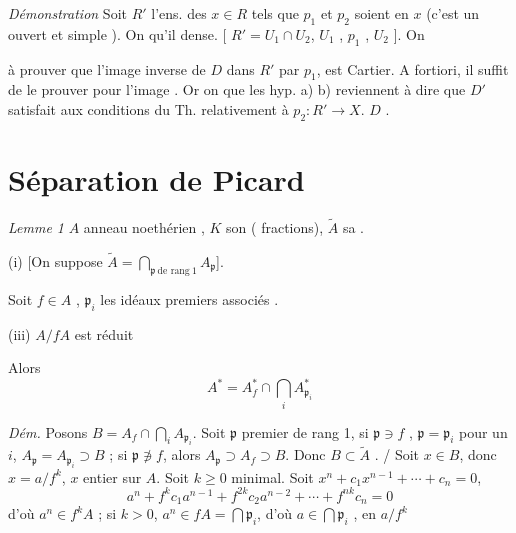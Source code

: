 \documentclass[11pt,a4paper]{article}
\begin{document}
\emph{Démonstration} Soit  $R'$ l'ens. des $x\in R$ tels que
$p_1$ et $p_2$ soient \ill{} en $x$ (c'est un ouvert \ill{} \ill{} et simple \ill{}). On
\ill{} qu'il  \ill{} \ill{} \ill{} \ill{} \ill{} dense.
[\ill{} $R'=U_1\cap U_2$, $U_1$ \ill{} \ill{} \ill{}, \ill{} \ill{} \ill{} $p_1$ \ill{}
\ill{} \ill{} \ill{}, \ill{} \ill{} \ill{} \ill{} $U_2$ \ill{}]. On \ill{} \ill{}
\marginal{\ill{}}

à prouver que l'image inverse  de $D$ dans $R'$ par
$p_1$, \struck{\ill{}} est Cartier. A fortiori, il suffit de le prouver pour l'image
\ill{} \ill{}.
Or \struck{\ill{}} on \ill{} que les hyp. a) b) \struck{\ill{}} reviennent à dire que $D'$
satisfait aux conditions du Th. relativement à $p_2\colon R'\to X$. \ill{} \ill{} $D$
\ill{} \ill{} \ill{} .

\section{Séparation de Picard}

\emph{Lemme 1} $A$ anneau noethérien  , $K$ son
  \ill{} (\ill{} fractions), $\tilde{A}$ sa \struck{\ill{}}
 \ill{}.

(i) [On suppose $\tilde{A}=\bigcap_{\mathfrak{p}\ \text{de rang}\ 1}A_{\mathfrak{p}}$].

Soit $f\in A$  , $\mathfrak{p}_i$ les idéaux
premiers associés \ill{}.

 

(iii) $A/fA$ est réduit

 Alors
\[
\boxed{A^*=A_f^*\cap\bigcap_i A^*_{\mathfrak{p}_i}}
\]

\emph{Dém.} Posons $B=A_f\cap\bigcap_i A_{\mathfrak{p}_i}$. Soit $\mathfrak{p}$ premier de
rang 1, si $\mathfrak{p}\ni f$ \ill{}, $\mathfrak{p}=\mathfrak{p}_i$ pour un $i$, \ill{}
$A_{\mathfrak{p}}=A_{\mathfrak{p}_i}\supset B$ ; si $\mathfrak{p}\not\ni f$, alors
$A_{\mathfrak{p}}\supset A_f\supset B$. Donc $B\subset\tilde{A}$ \ill{} \ill{}.
 / Soit $x\in B$,
donc $x=a/f^k$, $x$ entier sur $A$. Soit $k\geq 0$ minimal. \struck{\ill{}} Soit
$x^n+c_1x^{n-1}+\cdots+c_n=0$, \ill{}
\[
a^n+f^kc_1a^{n-1}+f^{2k}c_2a^{n-2}+\cdots+f^{nk}c_n=0
\]
d'où $a^n\in f^kA$ ; si $k>0$, \ill{} \ill{} \ill{} $a^n\in fA=\bigcap\mathfrak{p}_i$,
d'où $a\in\bigcap\mathfrak{p}_i$ ,  \ill{} en \ill{}  \ill{} \ill{} \ill{} \struck{\ill{}}
$a/f^k$
\end{document}
